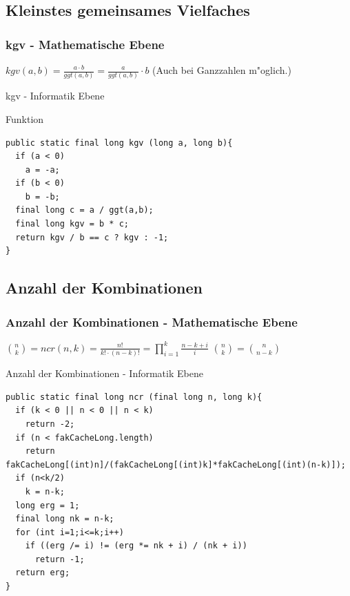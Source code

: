\documentclass{beamer}
\begin{document}
\subsection{Kleinstes gemeinsames Vielfaches} 
\begin{frame}\frametitle{kgv - Mathematische Ebene} 
\(kgv(a,b) = \frac{a \cdot b}{ggt(a,b)} = \frac{a}{ggt(a,b)} \cdot b\)\newline
(Auch bei Ganzzahlen m"oglich.)
\end{frame}
\begin{frame}[fragile]{kgv - Informatik Ebene}
	\begin{exampleblock}{Funktion}
		\begin{lstlisting}
public static final long kgv (long a, long b){
  if (a < 0)
    a = -a;
  if (b < 0)
    b = -b;
  final long c = a / ggt(a,b);
  final long kgv = b * c;
  return kgv / b == c ? kgv : -1;
}
		\end{lstlisting}
	\end{exampleblock}
\end{frame}
\subsection{Anzahl der Kombinationen} 
\begin{frame}\frametitle{Anzahl der Kombinationen - Mathematische Ebene} 
\({n \choose k} = ncr(n,k)=\frac{n!}{k! \cdot (n-k)!} = \prod \limits_{i=1}^{k} \frac{n-k+i}{i} \)\newline
\({n \choose k} = {n \choose n-k}\)
\end{frame}
\begin{frame}[fragile]{Anzahl der Kombinationen - Informatik Ebene}
\begin{lstlisting}
public static final long ncr (final long n, long k){
  if (k < 0 || n < 0 || n < k)
    return -2;
  if (n < fakCacheLong.length)
    return fakCacheLong[(int)n]/(fakCacheLong[(int)k]*fakCacheLong[(int)(n-k)]);
  if (n<k/2)
    k = n-k;
  long erg = 1;
  final long nk = n-k;
  for (int i=1;i<=k;i++)
    if ((erg /= i) != (erg *= nk + i) / (nk + i))
      return -1;
  return erg;
}
\end{lstlisting}
\end{frame}
\end{document}
